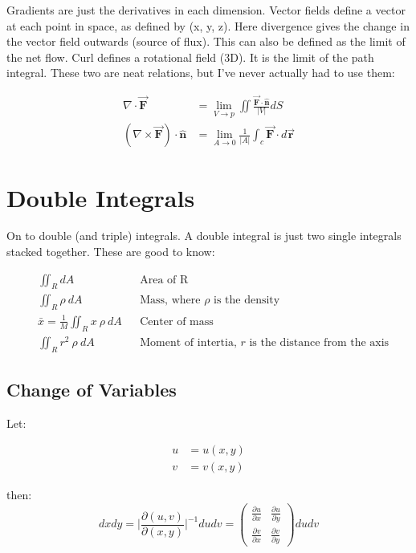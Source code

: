 \documentclass{article}
\newcommand{\der}{\partial}
\newcommand{\del}{\nabla}
\newcommand{\bm}[1]{\mathbf{#1}}
\newcommand{\vf}[1]{\vec{\mathbf{#1}}}
\newcommand{\norm}{\hat{\bm{n}}}
\begin{document}
Gradients are just the derivatives in each dimension. Vector fields define a vector at each point in space, as defined by (x, y, z).
\vskip 0.1in
Here divergence gives the change in the vector field outwards (source of flux). This can also be defined as the limit of the net flow. Curl defines a rotational field (3D). It is the limit of the path integral. These two are neat relations, but I've never actually had to use them:

\begin{align*}
    \del \cdot \vf{F} &=
        \lim_{V \to p} \iint
            \frac{\vf{F} \cdot \norm}{|V|} dS \\
    (\del \times \vf{F}) \cdot \norm &=
        \lim_{A \to 0}\frac{1}{|A|} \int_c \vf{F} \cdot d\vf{r}
\end{align*}

\section{Double Integrals}
On to double (and triple) integrals. A double integral is just two single integrals stacked together. These are good to know:

\begin{align*}
    &\iint_R dA && \text{Area of R} \\
    &\iint_R \rho\ dA && \text{Mass, where $\rho$ is the density} \\
    &\bar{x} = \frac{1}{M}\iint_R x\ \rho\ dA && \text{Center of mass} \\
    &\iint_R r^2\ \rho\ dA && \text{Moment of intertia, $r$ is the distance from the axis}
\end{align*}

\subsection{Change of Variables}
Let:

\begin{align*}
    u &= u(x, y) \\
    v &= v(x, y) 
\end{align*}

then:
\begin{equation*}
dx dy = \bigg|\frac{\der(u, v)}{\der(x, y)}\bigg|^{-1} du dv = \begin{pmatrix} \frac{\der u}{\der x} & \frac{\der u}{\der y} \\ \frac{\der v}{\der x} & \frac{\der v}{\der y} \end{pmatrix} du dv
\end{equation*}
\end{document}
